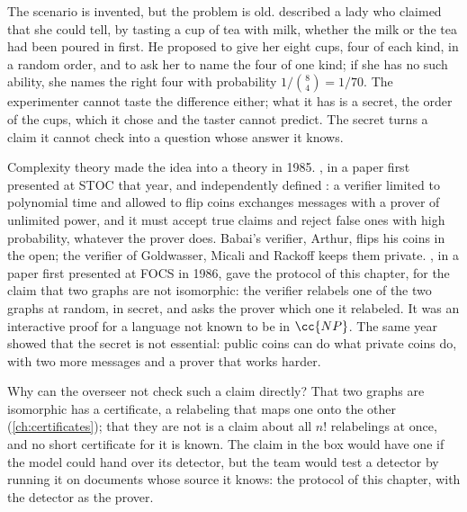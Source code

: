 \begin{refsection}
The scenario is invented, but the problem is old. \Textcite{Fisher1935} described a lady who claimed that she could tell, by tasting a cup of tea with milk, whether the milk or the tea had been poured in first. He proposed to give her eight cups, four of each kind, in a random order, and to ask her to name the four of one kind; if she has no such ability, she names the right four with probability $1/\binom84=1/70$. The experimenter cannot taste the difference either; what it has is a secret, the order of the cups, which it chose and the taster cannot predict. The secret turns a claim it cannot check into a question whose answer it knows.

Complexity theory made the idea into a theory in 1985. \Textcite{GoldwasserMicaliRackoff1989}, in a paper first presented at STOC that year, and independently \textcite{Babai1985} defined : a verifier limited to polynomial time and allowed to flip coins exchanges messages with a prover of unlimited power, and it must accept true claims and reject false ones with high probability, whatever the prover does. Babai's verifier, Arthur, flips his coins in the open; the verifier of Goldwasser, Micali and Rackoff keeps them private. \Textcite{GoldreichMicaliWigderson1991}, in a paper first presented at FOCS in 1986, gave the protocol of this chapter, for the claim that two graphs are not isomorphic: the verifier relabels one of the two graphs at random, in secret, and asks the prover which one it relabeled. It was an interactive proof for a language not known to be in $\cc{NP}$. The same year \textcite{GoldwasserSipser1986} showed that the secret is not essential: public coins can do what private coins do, with two more messages and a prover that works harder.

Why can the overseer not check such a claim directly? That two graphs are isomorphic has a certificate, a relabeling that maps one onto the other (\cref{ch:certificates}); that they are not is a claim about all $n!$ relabelings at once, and no short certificate for it is known. The claim in the box would have one if the model could hand over its detector, but the team would test a detector by running it on documents whose source it knows: the protocol of this chapter, with the detector as the prover.


\end{refsection}
